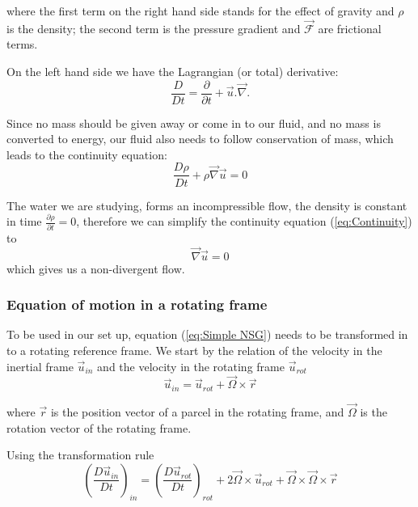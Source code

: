 \documentclass[12pt, a4paper]{article} %
\begin{document}
		where the first term on the right hand side stands for the effect of gravity and $\rho$ is the density; the second term is the pressure gradient and $\vec{\mathcal{F}}$ are frictional terms.
		
		On the left hand side we have the Lagrangian (or total) derivative:
		\begin{equation}
			\frac{D}{Dt} = \frac{\partial}{\partial t} + \vec{u}.\vec{\nabla}.
			\label{eq:Lag Dev}
		\end{equation} 
		
		
		Since no mass should be given away or come in to our fluid, and no mass is converted to energy, our fluid also needs to follow conservation of mass, which leads to the continuity equation:
		\begin{equation}
			\frac{D\rho}{Dt} + \rho \vec{\nabla} \vec{u} = 0
			\label{eq:Continuity}
		\end{equation}
		
		The water we are studying, forms an incompressible flow, the density is constant in time %
		 $\frac{\partial\rho}{\partial t} =0 $, therefore we can simplify the continuity equation (\ref{eq:Continuity}) to
		\begin{equation}
			\vec{\nabla} \vec{u} = 0
			\label{eq:nondivergence}
		\end{equation}
		which gives us a non-divergent flow.
		
		
		\subsubsection{Equation of motion in a rotating frame}		%
			To be used in our set up, equation (\ref{eq:Simple NSG}) needs to be transformed in to a rotating reference frame. We start by the relation of the velocity in the inertial frame $\vec{u}_{in}$ and the velocity in the rotating frame $\vec{u}_{rot}$
			\begin{equation}
				\vec{u}_{in} = \vec{u}_{rot} + \vec{\Omega}\times\vec{r}
				\label{eq:Velocity Frames}
			\end{equation}
			
			where $\vec{r}$ is the position vector of a parcel in the rotating frame, and $\vec{\Omega}$ is the rotation vector of the rotating frame.
			
			Using the transformation rule %
			\begin{equation}
				\left(\frac{D\vec{u}_{in}}{Dt}\right)_{in} = \left(\frac{D\vec{u}_{rot}}{Dt}\right)_{rot} + 2\vec{\Omega}\times\vec{u}_{rot} + \vec{\Omega}\times\vec{\Omega}\times\vec{r}
				\label{eq: Lag Dev Rot}
			\end{equation}
			
\end{document}
